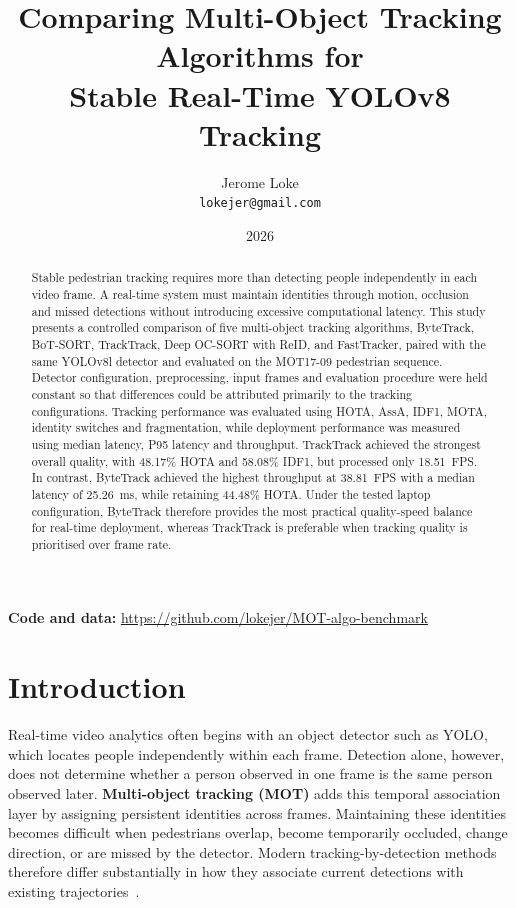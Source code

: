 \documentclass[11pt,a4paper]{article}
\title{Comparing Multi-Object Tracking Algorithms for\\Stable Real-Time YOLOv8 Tracking}
\author{Jerome Loke\\
\small\texttt{lokejer@gmail.com}}
\date{2026}
\begin{document}
\maketitle

\begin{abstract}
Stable pedestrian tracking requires more than detecting people independently in each video frame. A real-time system must maintain identities through motion, occlusion and missed detections without introducing excessive computational latency. This study presents a controlled comparison of five multi-object tracking algorithms, ByteTrack, BoT-SORT, TrackTrack, Deep OC-SORT with ReID, and FastTracker, paired with the same YOLOv8l detector and evaluated on the MOT17-09 pedestrian sequence. Detector configuration, preprocessing, input frames and evaluation procedure were held constant so that differences could be attributed primarily to the tracking configurations. Tracking performance was evaluated using HOTA, AssA, IDF1, MOTA, identity switches and fragmentation, while deployment performance was measured using median latency, P95 latency and throughput. TrackTrack achieved the strongest overall quality, with 48.17\% HOTA and 58.08\% IDF1, but processed only 18.51~FPS. In contrast, ByteTrack achieved the highest throughput at 38.81~FPS with a median latency of 25.26~ms, while retaining 44.48\% HOTA. Under the tested laptop configuration, ByteTrack therefore provides the most practical quality-speed balance for real-time deployment, whereas TrackTrack is preferable when tracking quality is prioritised over frame rate.
\end{abstract}

\noindent\textbf{Code and data:} \url{https://github.com/lokejer/MOT-algo-benchmark}

\section{Introduction}

Real-time video analytics often begins with an object detector such as YOLO, which locates people independently within each frame. Detection alone, however, does not determine whether a person observed in one frame is the same person observed later. \textbf{Multi-object tracking (MOT)} adds this temporal association layer by assigning persistent identities across frames. Maintaining these identities becomes difficult when pedestrians overlap, become temporarily occluded, change direction, or are missed by the detector. Modern tracking-by-detection methods therefore differ substantially in how they associate current detections with existing trajectories~\cite{bewley2016sort,wojke2017deepsort,zhang2022bytetrack,cao2023ocsort,aharon2022botsort}.
\end{document}

